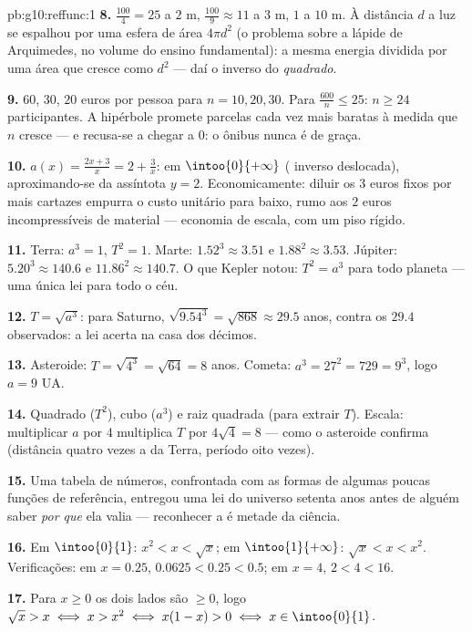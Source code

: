 \begin{solution}{pb:g10:reffunc:1}
\textbf{8.} $\frac{100}{4} = 25$ a $2$ m,
$\frac{100}{9} \approx 11$ a $3$ m, $1$ a $10$ m. À distância
$d$ a luz se espalhou por uma esfera de área $4\pi d^2$ (o
problema sobre a lápide de Arquimedes, no volume do ensino
fundamental): a mesma energia dividida por uma área que cresce
como $d^2$ --- daí o inverso do \emph{quadrado}.

\textbf{9.} $60$, $30$, $20$ euros por pessoa para $n = 10, 20,
30$. Para $\frac{600}{n} \leq 25$: $n \geq 24$ participantes. A
hipérbole promete parcelas cada vez mais baratas à medida que
$n$ cresce --- e recusa-se a chegar a $0$: o ônibus nunca é de
graça.

\textbf{10.} $a(x) = \frac{2x + 3}{x} = 2 + \frac3x$:
 em $\intoo{0}{+\infty}$ ( inverso deslocada),
aproximando-se da assíntota $y = 2$. Economicamente: diluir os
$3$ euros fixos por mais cartazes empurra o custo unitário para
baixo, rumo aos $2$ euros incompressíveis de material ---
economia de escala, com um piso rígido.

\textbf{11.} Terra: $a^3 = 1$, $T^2 = 1$. Marte:
$1.52^3 \approx 3.51$ e $1.88^2 \approx 3.53$. Júpiter:
$5.20^3 \approx 140.6$ e $11.86^2 \approx 140.7$. O que Kepler
notou: $T^2 = a^3$ para todo planeta --- uma única lei para
todo o céu.

\textbf{12.} $T = \sqrt{a^3}$: para Saturno,
$\sqrt{9.54^3} = \sqrt{868} \approx 29.5$ anos, contra os
$29.4$ observados: a lei acerta na casa dos décimos.

\textbf{13.} Asteroide: $T = \sqrt{4^3} = \sqrt{64} = 8$ anos.
Cometa: $a^3 = 27^2 = 729 = 9^3$, logo $a = 9$ UA.

\textbf{14.} Quadrado ($T^2$), cubo ($a^3$) e raiz quadrada
(para extrair $T$). Escala: multiplicar $a$ por $4$ multiplica
$T$ por $4\sqrt4 = 8$ --- como o asteroide confirma (distância
quatro vezes a da Terra, período oito vezes).

\textbf{15.} Uma tabela de números, confrontada com as formas
de algumas poucas funções de referência, entregou uma lei do
universo setenta anos antes de alguém saber \emph{por que} ela
valia --- reconhecer a  é metade da ciência.

\textbf{16.} Em $\intoo{0}{1}$: $x^2 < x < \sqrt x$; em
$\intoo{1}{+\infty}$: $\sqrt x < x < x^2$. Verificações: em
$x = 0.25$, $0.0625 < 0.25 < 0.5$; em $x = 4$,
$2 < 4 < 16$.

\textbf{17.} Para $x \geq 0$ os dois lados são $\geq 0$, logo
$\sqrt x > x \iff x > x^2 \iff x(1 - x) > 0 \iff
x \in \intoo{0}{1}$.


\end{solution}
